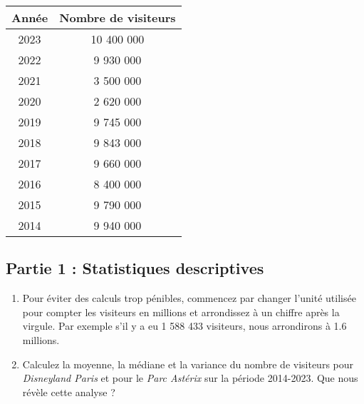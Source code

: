 \documentclass[a4paper,11pt]{article}
\begin{document}
\begin{center}
\vspace{.2cm}

\begin{tabular}{c|c}
Année & Nombre de visiteurs \\
\hline
2023 & 10 400 000 \\
2022 & 9 930 000 \\
2021 & 3 500 000 \\
2020 & 2 620 000 \\
2019 & 9 745 000 \\
2018 & 9 843 000 \\
2017 & 9 660 000 \\
2016 & 8 400 000 \\
2015 & 9 790 000 \\
2014 & 9 940 000 \\
\end{tabular}
\end{center}

\subsection*{Partie 1 : Statistiques descriptives}
\begin{enumerate}
    \item Pour éviter des calculs trop pénibles, commencez par changer l'unité utilisée pour compter les visiteurs en millions et arrondissez à un chiffre après la virgule. Par exemple s'il y a eu 1 588 433 visiteurs, nous arrondirons à 1.6 millions. 
    \item Calculez la moyenne, la médiane et la variance du nombre de visiteurs pour \textit{Disneyland Paris} et pour le \textit{Parc Astérix} sur la période 2014-2023. Que nous révèle cette analyse ?
\end{enumerate}
\end{document}
